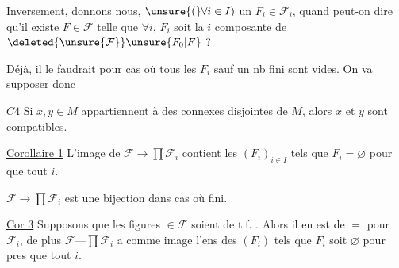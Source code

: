 Inversement, donnons nous,  $\unsure{(}\forall i\in I)$ un $F_i\in\mathcal F_i$, quand peut-on dire qu'il existe $F\in\mathcal F$ telle que $\forall i$, $F_i$ soit la $i$ composante de $\deleted{\unsure{\mathcal F}}\unsure{F_0|F}$ ?

Déjà, il le faudrait pour  cas où tous les $F_i$ sauf un nb fini sont \deleted{$\varnothing$} vides. On va supposer donc

\uline{$C4$} Si $x,y\in M$ appartiennent à des  connexes disjointes de $M$, alors $x$ et $y$ sont compatibles.

 

\uline{Corollaire 1} L'image de $\mathcal F\to\prod\mathcal F_i$ contient les $(F_i)_{i\in I}$ tels que $F_i=\varnothing$  pour  que tout $i$.

  $\mathcal F\to\prod\mathcal F_i$ est une bijection dans   cas où    fini.



\uline{Cor 3} Supposons que les figures  $\in\mathcal F$ soient de t.f.  . Alors il en est de $=$  pour $\mathcal F_i$, de plus $\mathcal F\text{---}\prod\mathcal F_i$ a comme image l'ens des $(F_i)$ tels que $F_i$ soit $\varnothing$ pour pres que tout $i$.
